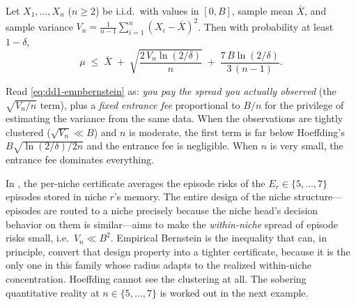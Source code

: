 \begin{theorem}
\label{thm:dd1-empbernstein}
Let $X_1, \dots, X_n$ ($n \ge 2$) be i.i.d.\ with values in $[0, B]$, sample
mean $\bar{X}$, and sample variance
$V_n = \frac{1}{n - 1}\sum_{i=1}^n (X_i - \bar{X})^2$. Then with probability
at least $1 - \delta$,
\begin{equation}
\label{eq:dd1-empbernstein}
\mu \;\le\; \bar{X} \;+\; \sqrt{ \frac{2\, V_n \ln(2/\delta)}{n} }
\;+\; \frac{7\, B \ln(2/\delta)}{3\,(n - 1)} .
\end{equation}
\end{theorem}

\begin{intuition}
Read \eqref{eq:dd1-empbernstein} as: \emph{you pay the spread you actually
observed} (the $\sqrt{V_n/n}$ term), plus a \emph{fixed entrance fee}
proportional to $B/n$ for the privilege of estimating the variance from the
same data. When the observations are tightly clustered ($\sqrt{V_n} \ll B$)
and $n$ is moderate, the first term is far below Hoeffding's
$B\sqrt{\ln(2/\delta)/2n}$ and the entrance fee is negligible. When $n$ is
very small, the entrance fee dominates everything.
\end{intuition}

\begin{remark}[Why this matters at $E_r = 5$--$7$ episodes]
\label{rem:dd1-small-n}
In \nm{}, the per-niche certificate averages the episode risks of the
$E_r \in \{5, \dots, 7\}$ episodes stored in niche $r$'s memory. The entire
design of the niche structure---episodes are routed to a niche precisely
because the niche head's decision behavior on them is similar---aims to make
the \emph{within-niche} spread of episode risks small, i.e.\ $V_n \ll B^2$.
Empirical Bernstein is the inequality that can, in principle, convert that
design property into a tighter certificate, because it is the only one in
this family whose radius adapts to the realized within-niche concentration.
Hoeffding cannot see the clustering at all. The sobering quantitative reality
at $n \in \{5, \dots, 7\}$ is worked out in the next example.
\end{remark}

